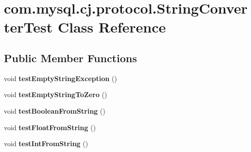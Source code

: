 \hypertarget{classcom_1_1mysql_1_1cj_1_1protocol_1_1_string_converter_test}{}\section{com.\+mysql.\+cj.\+protocol.\+String\+Converter\+Test Class Reference}
\label{classcom_1_1mysql_1_1cj_1_1protocol_1_1_string_converter_test}
\subsection*{Public Member Functions}
\begin{DoxyCompactItemize}
\item 
\mbox{\label{classcom_1_1mysql_1_1cj_1_1protocol_1_1_string_converter_test_a387cfaa04873199a7a26516d09bc55fd}} 
void {\bfseries test\+Empty\+String\+Exception} ()
\item 
\mbox{\label{classcom_1_1mysql_1_1cj_1_1protocol_1_1_string_converter_test_abf305a1ab3bd3df4ee3c7f0ed95c1764}} 
void {\bfseries test\+Empty\+String\+To\+Zero} ()
\item 
\mbox{\label{classcom_1_1mysql_1_1cj_1_1protocol_1_1_string_converter_test_a9b7ec10043f4635cedfeb0f1a7a102c7}} 
void {\bfseries test\+Boolean\+From\+String} ()
\item 
\mbox{\label{classcom_1_1mysql_1_1cj_1_1protocol_1_1_string_converter_test_aa7e0afe3a74e1dd3e1ed5321701e60be}} 
void {\bfseries test\+Float\+From\+String} ()
\item 
\mbox{\label{classcom_1_1mysql_1_1cj_1_1protocol_1_1_string_converter_test_a9d92f1613330dd91b018666e5a36b5da}} 
void {\bfseries test\+Int\+From\+String} ()
\item 
\mbox{\label{classcom_1_1mysql_1_1cj_1_1protocol_1_1_string_converter_test_a23661dd380e5927aab9557351af90de6}} 

\end{DoxyCompactItemize}
